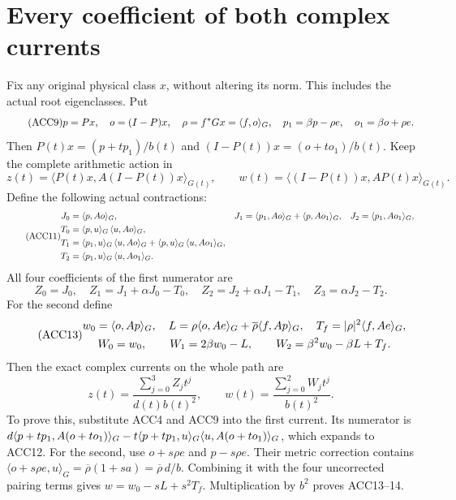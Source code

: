 \documentclass[11pt]{article}
\begin{document}
\section{Every coefficient of both complex currents}
Fix any original physical class \(x\), without altering its norm.
This includes the actual root eigenclasses. Put
\begin{equation}\tag{ACC9}
p=Px,\quad o=(I-P)x,\quad \rho=f^*Gx=\langle f,o\rangle_G,\quad
p_1=\beta p-\rho e,\quad o_1=\beta o+\rho e.
\end{equation}
Then \(P(t)x=(p+tp_1)/b(t)\) and
\((I-P(t))x=(o+to_1)/b(t)\).
Keep the complete arithmetic action in
\begin{equation}\tag{ACC10}
z(t)=\langle P(t)x,A(I-P(t))x\rangle_{G(t)},\qquad
w(t)=\langle(I-P(t))x,AP(t)x\rangle_{G(t)} .
\end{equation}
Define the following actual contractions:
\begin{equation}\tag{ACC11}
\begin{aligned}
J_0&=\langle p,Ao\rangle_G,&
J_1&=\langle p_1,Ao\rangle_G+\langle p,Ao_1\rangle_G,&
J_2&=\langle p_1,Ao_1\rangle_G,\\
T_0&=\langle p,u\rangle_G\,\langle u,Ao\rangle_G,\\
T_1&=\langle p_1,u\rangle_G\,\langle u,Ao\rangle_G+\langle p,u\rangle_G\,\langle u,Ao_1\rangle_G,\\
T_2&=\langle p_1,u\rangle_G\,\langle u,Ao_1\rangle_G.
\end{aligned}
\end{equation}
All four coefficients of the first numerator are
\begin{equation}\tag{ACC12}
Z_0=J_0,\quad Z_1=J_1+\alpha J_0-T_0,\quad
Z_2=J_2+\alpha J_1-T_1,\quad Z_3=\alpha J_2-T_2 .
\end{equation}
For the second define
\begin{equation}\tag{ACC13}
\begin{gathered}
w_0=\langle o,Ap\rangle_G,\quad
L=\rho\langle o,Ae\rangle_G+\overline\rho\langle f,Ap\rangle_G,\quad
T_f=|\rho|^2\langle f,Ae\rangle_G,\\
W_0=w_0,\qquad W_1=2\beta w_0-L,\qquad
W_2=\beta^2w_0-\beta L+T_f .
\end{gathered}
\end{equation}
Then the exact complex currents on the whole path are
\begin{equation}\tag{ACC14}
\boxed{z(t)=\frac{\sum_{j=0}^3Z_jt^j}{d(t)b(t)^2},\qquad
w(t)=\frac{\sum_{j=0}^2W_jt^j}{b(t)^2}.}
\end{equation}
To prove this, substitute ACC4 and ACC9 into the first current.
Its numerator is
\(d\langle p+tp_1,A(o+to_1)\rangle_G
-t\langle p+tp_1,u\rangle_G\langle u,A(o+to_1)\rangle_G\), which expands to ACC12.
For the second, use \(o+s\rho e\) and \(p-s\rho e\).
Their metric correction contains
\(\langle o+s\rho e,u\rangle_G
=\overline\rho(1+sa)=\overline\rho\,d/b\).
Combining it with the four uncorrected pairing terms gives
\(w=w_0-sL+s^2T_f\). Multiplication by \(b^2\) proves ACC13--14.
\end{document}
